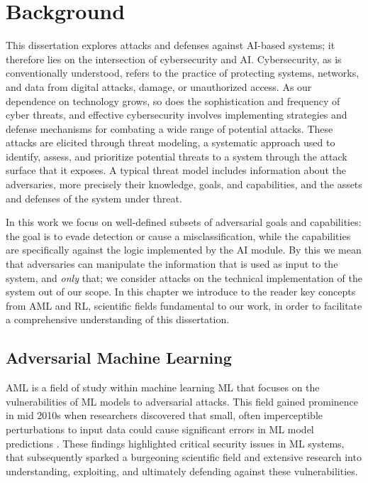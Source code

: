 \chapter{Background}\label{ch:background}
\label{ch:background}

This dissertation explores attacks and defenses against AI-based systems; it therefore lies on the intersection of cybersecurity and AI.
Cybersecurity, as is conventionally understood, refers to the practice of protecting systems, networks, and data from digital attacks, damage, or unauthorized access.
As our dependence on technology grows, so does the sophistication and frequency of cyber threats, and effective cybersecurity involves implementing strategies and defense mechanisms for combating a wide range of potential attacks.
These attacks are elicited through threat modeling, a systematic approach used to identify, assess, and prioritize potential threats to a system through the attack surface that it exposes.
A typical threat model includes information about the adversaries, more precisely their knowledge, goals, and capabilities, and the assets and defenses of the system under threat.

In this work we focus on well-defined subsets of adversarial goals and capabilities: the goal is to evade detection or cause a misclassification, while the capabilities are specifically against the logic implemented by the AI module.
By this we mean that adversaries can manipulate the information that is used as input to the system, and \textit{only} that; we consider attacks on the technical implementation of the system out of our scope.
In this chapter we introduce to the reader key concepts from \gls{AML} and \gls{RL}, scientific fields fundamental to our work, in order to facilitate a comprehensive understanding of this dissertation.

\section{Adversarial Machine Learning}
\gls{AML} is a field of study within machine learning \gls{ML} that focuses on the vulnerabilities of \gls{ML} models to adversarial attacks.
This field gained prominence in mid 2010s when researchers discovered that small, often imperceptible perturbations to input data could cause significant errors in ML model predictions \cite{biggio2013evasion, szegedy2013intriguing}.
These findings highlighted critical security issues in ML systems, that subsequently sparked a burgeoning scientific field and extensive research into understanding, exploiting, and ultimately defending against these vulnerabilities.

